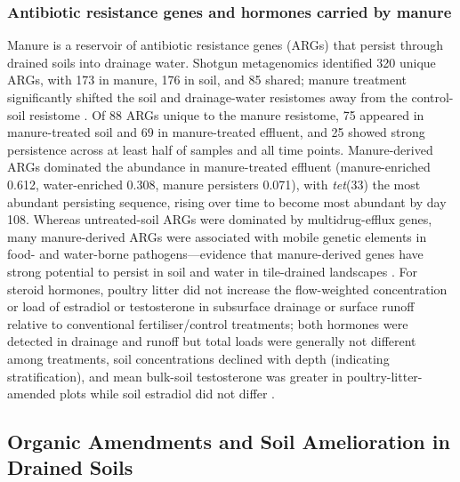 \subsubsection{Antibiotic resistance genes and hormones carried by manure}
Manure is a reservoir of antibiotic resistance genes (ARGs) that persist through drained soils into drainage water. Shotgun metagenomics identified 320 unique ARGs, with 173 in manure, 176 in soil, and 85 shared; manure treatment significantly shifted the soil and drainage-water resistomes away from the control-soil resistome \parencite{Smith2019b}. Of 88 ARGs unique to the manure resistome, 75 appeared in manure-treated soil and 69 in manure-treated effluent, and 25 showed strong persistence across at least half of samples and all time points. Manure-derived ARGs dominated the abundance in manure-treated effluent (manure-enriched 0.612, water-enriched 0.308, manure persisters 0.071), with \textit{tet}(33) the most abundant persisting sequence, rising over time to become most abundant by day 108. Whereas untreated-soil ARGs were dominated by multidrug-efflux genes, many manure-derived ARGs were associated with mobile genetic elements in food- and water-borne pathogens---evidence that manure-derived genes have strong potential to persist in soil and water in tile-drained landscapes \parencite{Smith2019b}. For steroid hormones, poultry litter did not increase the flow-weighted concentration or load of estradiol or testosterone in subsurface drainage or surface runoff relative to conventional fertiliser/control treatments; both hormones were detected in drainage and runoff but total loads were generally not different among treatments, soil concentrations declined with depth (indicating stratification), and mean bulk-soil testosterone was greater in poultry-litter-amended plots while soil estradiol did not differ \parencite{Jenkins2009}.

\subsection{Organic Amendments and Soil Amelioration in Drained Soils}


